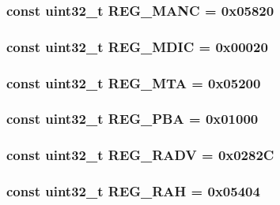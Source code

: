 \label{namespaceiGbReg_a15c1307f1e65e489f3ca5fb75212d71d}
\hypertarget{namespaceiGbReg_add1b433d6b59293827d8b1243c113ff7}{
\subsubsection[{REG\_\-MANC}]{\setlength{\rightskip}{0pt plus 5cm}const {\bf uint32\_\-t} {\bf REG\_\-MANC} = 0x05820}}
\label{namespaceiGbReg_add1b433d6b59293827d8b1243c113ff7}
\hypertarget{namespaceiGbReg_af363a2b7433ba64df839c6a45beb0e05}{
\subsubsection[{REG\_\-MDIC}]{\setlength{\rightskip}{0pt plus 5cm}const {\bf uint32\_\-t} {\bf REG\_\-MDIC} = 0x00020}}
\label{namespaceiGbReg_af363a2b7433ba64df839c6a45beb0e05}
\hypertarget{namespaceiGbReg_a9180502721e1193be91b79b98c3f40cf}{
\subsubsection[{REG\_\-MTA}]{\setlength{\rightskip}{0pt plus 5cm}const {\bf uint32\_\-t} {\bf REG\_\-MTA} = 0x05200}}
\label{namespaceiGbReg_a9180502721e1193be91b79b98c3f40cf}
\hypertarget{namespaceiGbReg_a095339ea1d33453b7754d407c6e6550c}{
\subsubsection[{REG\_\-PBA}]{\setlength{\rightskip}{0pt plus 5cm}const {\bf uint32\_\-t} {\bf REG\_\-PBA} = 0x01000}}
\label{namespaceiGbReg_a095339ea1d33453b7754d407c6e6550c}
\hypertarget{namespaceiGbReg_ae1605063bdee3a13f9e9eda5280a7d74}{
\subsubsection[{REG\_\-RADV}]{\setlength{\rightskip}{0pt plus 5cm}const {\bf uint32\_\-t} {\bf REG\_\-RADV} = 0x0282C}}
\label{namespaceiGbReg_ae1605063bdee3a13f9e9eda5280a7d74}
\hypertarget{namespaceiGbReg_afbf8013fc467361c016303bdeeab4255}{
\subsubsection[{REG\_\-RAH}]{\setlength{\rightskip}{0pt plus 5cm}const {\bf uint32\_\-t} {\bf REG\_\-RAH} = 0x05404}}
